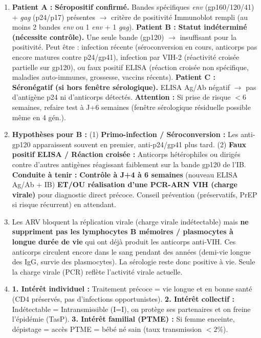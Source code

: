 \documentclass[11pt]{article}
\begin{document}
\begin{corrige}[Exercice n°1]
\begin{enumerate}
    \item \textbf{Patient A :} \textbf{Séropositif confirmé.} Bandes spécifiques \emph{env} (gp160/120/41) + \emph{gag} (p24/p17) présentes $\rightarrow$ critère de positivité Immunoblot rempli (au moins 2 bandes \emph{env} ou 1 \emph{env} + 1 \emph{gag}).
    \textbf{Patient B :} \textbf{Statut indéterminé (nécessite contrôle).} Une seule bande (gp120) $\rightarrow$ insuffisant pour la positivité. Peut être : infection récente (séroconversion en cours, anticorps pas encore matures contre p24/gp41), infection par VIH-2 (réactivité croisée partielle sur gp120), ou faux positif ELISA (réaction croisée non spécifique, maladies auto-immunes, grossesse, vaccins récents).
    \textbf{Patient C :} \textbf{Séronégatif (si hors fenêtre sérologique).} ELISA Ag/Ab négatif $\rightarrow$ pas d'antigène p24 ni d'anticorps détectés. \textbf{Attention :} Si prise de risque $< 6$ semaines, refaire test à J+6 semaines (fenêtre sérologique résiduelle possible même en 4 gén.).
    \item \textbf{Hypothèses pour B :} (1) \textbf{Primo-infection / Séroconversion :} Les anti-gp120 apparaissent souvent en premier, anti-p24/gp41 plus tard. (2) \textbf{Faux positif ELISA / Réaction croisée :} Anticorps hétérophiles ou dirigés contre d'autres antigènes réagissant faiblement sur la bande gp120 de l'IB.
    \textbf{Conduite à tenir :} \textbf{Contrôle à J+4 à 6 semaines} (nouveau ELISA Ag/Ab + IB) \textbf{ET/OU réalisation d'une PCR-ARN VIH (charge virale)} pour diagnostic direct précoce. Conseil prévention (préservatifs, PrEP si risque récurrent) en attendant.
    \item Les ARV bloquent la réplication virale (charge virale indétectable) mais \textbf{ne suppriment pas les lymphocytes B mémoires / plasmocytes à longue durée de vie} qui ont déjà produit les anticorps anti-VIH. Ces anticorps circulent encore dans le sang pendant des années (demi-vie longue des IgG, survie des plasmocytes). La sérologie reste donc positive à vie. Seule la charge virale (PCR) reflète l'activité virale actuelle.
    \item \textbf{1. Intérêt individuel :} Traitement précoce = vie longue et en bonne santé (CD4 préservés, pas d'infections opportunistes). \textbf{2. Intérêt collectif :} Indétectable = Intransmissible (I=I), on protège ses partenaires et on freine l'épidémie (TasP). \textbf{3. Intérêt familial (PTME) :} Si femme enceinte, dépistage = accès PTME = bébé né sain (taux transmission $< 2\%$).
\end{enumerate}
\end{corrige}
\end{document}
